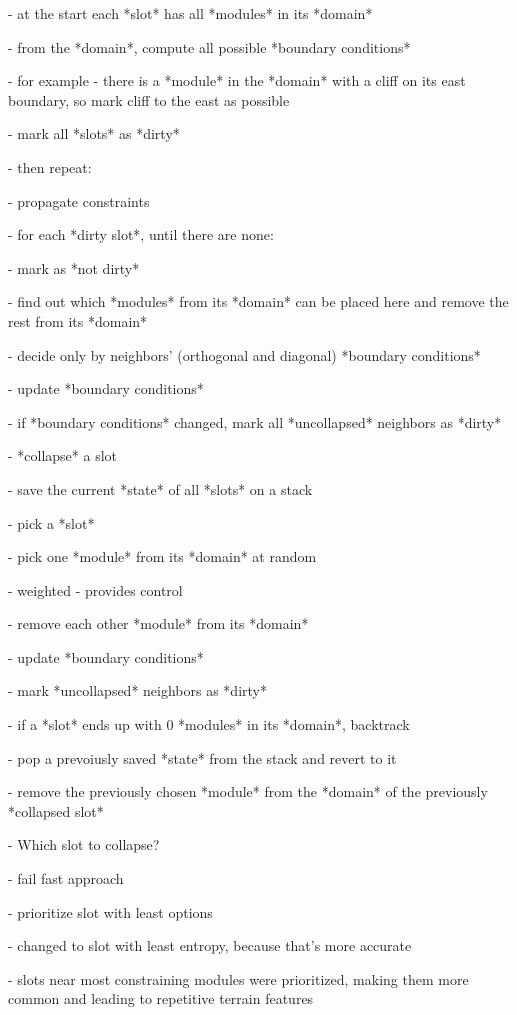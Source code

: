 - at the start each *slot* has all *modules* in its *domain*

- from the *domain*, compute all possible *boundary conditions*

- for example - there is a *module* in the *domain* with a cliff on its east boundary, so mark cliff to the east as possible

- mark all *slots* as *dirty*

- then repeat:

- propagate constraints

- for each *dirty slot*, until there are none:

- mark as *not dirty*

- find out which *modules* from its *domain* can be placed here and remove the rest from its *domain*

- decide only by neighbors' (orthogonal and diagonal) *boundary conditions*

- update *boundary conditions*

- if *boundary conditions* changed, mark all *uncollapsed* neighbors as *dirty*

- *collapse* a slot

- save the current *state* of all *slots* on a stack

- pick a *slot*

- pick one *module* from its *domain* at random

- weighted - provides control

- remove each other *module* from its *domain*

- update *boundary conditions*

- mark *uncollapsed* neighbors as *dirty*

- if a *slot* ends up with 0 *modules* in its *domain*, backtrack

- pop a prevoiusly saved *state* from the stack and revert to it

- remove the previously chosen *module* from the *domain* of the previously *collapsed slot*


- Which slot to collapse?

- fail fast approach

- prioritize slot with least options

- changed to slot with least entropy, because that's more accurate

- slots near most constraining modules were prioritized, making them more common and leading to repetitive terrain features

